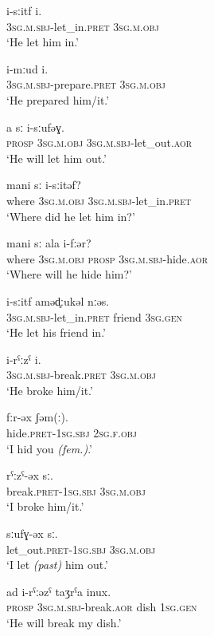 \documentclass[14pt]{extarticle}
\newcommand{\SG}{\textsc{sg}}
\newcommand{\M}{\textsc{m}}
\newcommand{\F}{\textsc{f}}
\newcommand{\PROSP}{\textsc{prosp}}
\newcommand{\SBJ}{\textsc{sbj}}
\newcommand{\OBJ}{\textsc{obj}}
\newcommand{\GEN}{\textsc{gen}}
\newcommand{\AOR}{\textsc{aor}}
\newcommand{\PRET}{\textsc{pret}}
\begin{document}
\begin{exe}
\ex
\gll i-sːitf i.\\
3{\SG}.{\M}.{\SBJ}-let\_in.{\PRET} 3{\SG}.{\M}.{\OBJ}\\
\glt `He let him in.'

\ex
\gll i-mːud i.\\
3{\SG}.{\M}.{\SBJ}-prepare.{\PRET} 3{\SG}.{\M}.{\OBJ}\\
\glt `He prepared him/it.'

\ex
\gll a sː i-sːufəɣ.\\
{\PROSP} 3{\SG}.{\M}.{\OBJ} 3{\SG}.{\M}.{\SBJ}-let\_out.{\AOR}\\
\glt `He will let him out.'

\ex
\gll mani sː i-sːitəf?\\
where 3{\SG}.{\M}.{\OBJ} 3{\SG}.{\M}.{\SBJ}-let\_in.{\PRET}\\
\glt `Where did he let him in?'

\ex
\gll mani sː ala i-fːər?\\
where 3{\SG}.{\M}.{\OBJ} {\PROSP} 3{\SG}.{\M}.{\SBJ}-hide.{\AOR}\\
\glt `Where will he hide him?'

\ex
\gll i-sːitf aməd̥ːukəl nːəs.\\
3{\SG}.{\M}.{\SBJ}-let\_in.{\PRET} friend 3{\SG}.{\GEN}\\
\glt `He let his friend in.'

\ex
\gll i-rˁːzˁ i.\\
3{\SG}.{\M}.{\SBJ}-break.{\PRET} 3{\SG}.{\M}.{\OBJ}\\
\glt `He broke him/it.'

\ex
\gll fːr-əx ʃəm(ː).\\
hide.{\PRET}-1{\SG}.{\SBJ} 2{\SG}.{\F}.{\OBJ}\\
\glt `I hid you \textit{(fem.)}.'

\ex
\gll rˁːzˁ-əx sː.\\
break.{\PRET}-1{\SG}.{\SBJ} 3{\SG}.{\M}.{\OBJ}\\
\glt `I broke him/it.'

\ex
\gll sːufɣ-əx sː.\\
let\_out.{\PRET}-1{\SG}.{\SBJ} 3{\SG}.{\M}.{\OBJ}\\
\glt `I let \textit{(past)} him out.'

\clearpage

\ex
\gll ad i-rˁːəzˁ taʒrˁa inux.\\
{\PROSP} 3{\SG}.{\M}.{\SBJ}-break.{\AOR} dish 1{\SG}.{\GEN}\\
\glt `He will break my dish.'


\end{exe}
\end{document}
